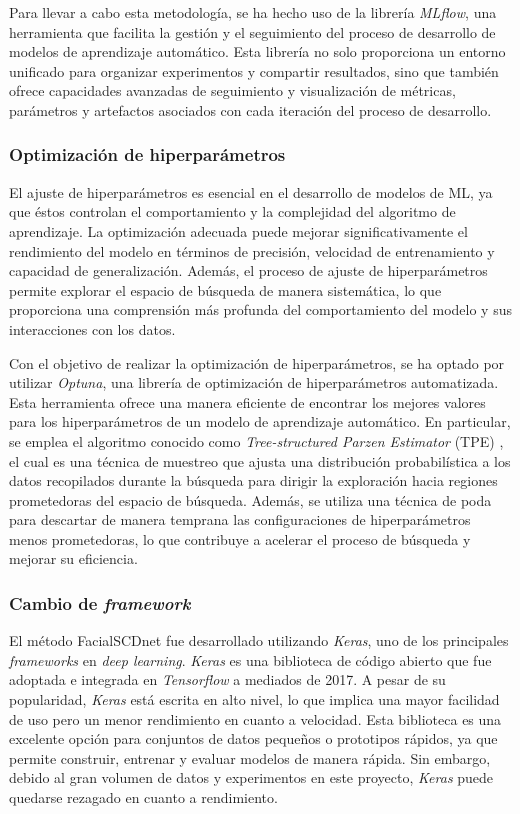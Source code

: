 Para llevar a cabo esta metodología, se ha hecho uso de la librería \textit{MLflow}, una herramienta que facilita la gestión y el seguimiento del proceso de desarrollo de modelos de aprendizaje automático. Esta librería no solo proporciona un entorno unificado para organizar experimentos y compartir resultados, sino que también ofrece capacidades avanzadas de seguimiento y visualización de métricas, parámetros y artefactos asociados con cada iteración del proceso de desarrollo.

\subsubsection{Optimización de hiperparámetros}

El ajuste de hiperparámetros es esencial en el desarrollo de modelos de ML, ya que éstos controlan el comportamiento y la complejidad del algoritmo de aprendizaje. La optimización adecuada puede mejorar significativamente el rendimiento del modelo en términos de precisión, velocidad de entrenamiento y capacidad de generalización. Además, el proceso de ajuste de hiperparámetros permite explorar el espacio de búsqueda de manera sistemática, lo que proporciona una comprensión más profunda del comportamiento del modelo y sus interacciones con los datos.

Con el objetivo de realizar la optimización de hiperparámetros, se ha optado por utilizar \textit{Optuna}, una librería de optimización de hiperparámetros automatizada. Esta herramienta ofrece una manera eficiente de encontrar los mejores valores para los hiperparámetros de un modelo de aprendizaje automático. En particular, se emplea el algoritmo conocido como \textit{Tree-structured Parzen Estimator} (TPE) \cite{71}, el cual es una técnica de muestreo que ajusta una distribución probabilística a los datos recopilados durante la búsqueda para dirigir la exploración hacia regiones prometedoras del espacio de búsqueda. Además, se utiliza una técnica de poda para descartar de manera temprana las configuraciones de hiperparámetros menos prometedoras, lo que contribuye a acelerar el proceso de búsqueda y mejorar su eficiencia.


\subsubsection{Cambio de \textit{framework}}

El método FacialSCDnet fue desarrollado utilizando \textit{Keras}, uno de los principales \textit{frameworks} en \textit{deep learning}. \textit{Keras} es una biblioteca de código abierto que fue adoptada e integrada en \textit{Tensorflow} a mediados de 2017. A pesar de su popularidad, \textit{Keras} está escrita en alto nivel, lo que implica una mayor facilidad de uso pero un menor rendimiento en cuanto a velocidad. Esta biblioteca es una excelente opción para conjuntos de datos pequeños o prototipos rápidos, ya que permite construir, entrenar y evaluar modelos de manera rápida. Sin embargo, debido al gran volumen de datos y experimentos en este proyecto, \textit{Keras} puede quedarse rezagado en cuanto a rendimiento.

